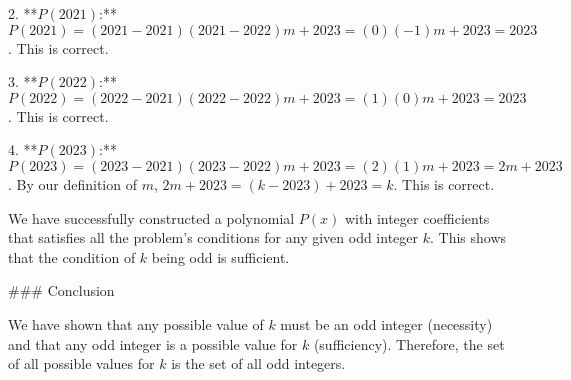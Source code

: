 2.  **$P(2021)$:** $P(2021) = (2021-2021)(2021-2022)m + 2023 = (0)(-1)m + 2023 = 2023$. This is correct.

3.  **$P(2022)$:** $P(2022) = (2022-2021)(2022-2022)m + 2023 = (1)(0)m + 2023 = 2023$. This is correct.

4.  **$P(2023)$:** $P(2023) = (2023-2021)(2023-2022)m + 2023 = (2)(1)m + 2023 = 2m + 2023$. By our definition of $m$, $2m + 2023 = (k-2023) + 2023 = k$. This is correct.

We have successfully constructed a polynomial $P(x)$ with integer coefficients that satisfies all the problem's conditions for any given odd integer $k$. This shows that the condition of $k$ being odd is sufficient.

### Conclusion

We have shown that any possible value of $k$ must be an odd integer (necessity) and that any odd integer is a possible value for $k$ (sufficiency).
Therefore, the set of all possible values for $k$ is the set of all odd integers.